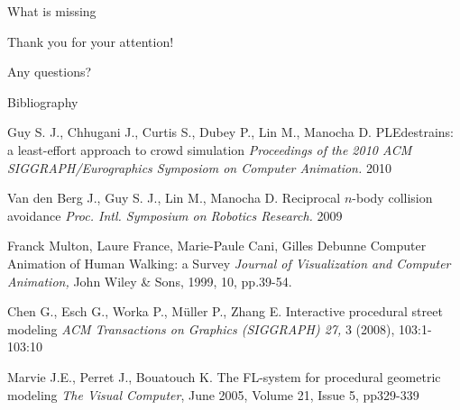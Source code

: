 \documentclass{beamer}
\begin{document}
\begin{frame}{What is missing}
\begin{LARGE}
\begin{center}
  Thank you for your attention!
  
  Any questions?
    \end{center}
  \end{LARGE}
\end{frame}


\begin{frame}[allowframebreaks]{Bibliography}
  \begin{thebibliography}{10}


    Guy S. J., Chhugani J., Curtis S., Dubey P., Lin M., Manocha D.
    \newblock PLEdestrains: a least-effort approach to crowd simulation
    \newblock \emph{Proceedings of the 2010 ACM SIGGRAPH/Eurographics Symposiom on Computer Animation.} 2010

    Van den Berg J., Guy S. J., Lin M., Manocha D.
    \newblock Reciprocal $n$-body collision avoidance
    \newblock \emph{Proc. Intl. Symposium on Robotics Research.} 2009

    Franck Multon, Laure France, Marie-Paule Cani, Gilles Debunne
    \newblock Computer Animation of Human Walking: a Survey
    \newblock \emph{Journal of Visualization and Computer Animation,} John Wiley \& Sons, 1999, 10, pp.39-54.


    Chen G., Esch G., Worka P., Müller P., Zhang E.
    \newblock Interactive procedural street modeling
    \newblock \emph{ACM Transactions on Graphics (SIGGRAPH) 27,} 3 (2008), 103:1-103:10



    Marvie J.E., Perret J., Bouatouch K.
    \newblock The FL-system for procedural geometric modeling
    \newblock \emph{The Visual Computer}, June 2005, Volume 21, Issue 5, pp329-339


\end{thebibliography}
\end{frame}
\end{document}
